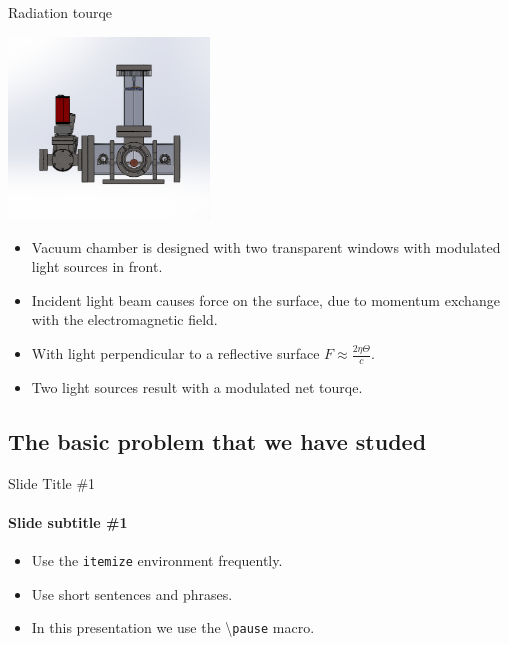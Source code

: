 \documentclass{beamer}
\begin{document}
\begin{frame}{\hypertarget{frame:Radiation tourqe}{Radiation tourqe}}
	\begin{center}		
		\includegraphics[width=0.4\textwidth,keepaspectratio]{total_chamber.png}
	\end{center}
	\begin{itemize}		
		\item Vacuum chamber is designed with two transparent windows with modulated light sources in front.
		\pause
		\item Incident light beam causes force on the surface, due to momentum exchange with the electromagnetic field.
		\pause
		\item With light perpendicular to a reflective surface $F  \approx\frac{2\eta\Theta}{{c}} $.
		\item Two light sources result with a modulated net tourqe.
		
	\end{itemize}
\end{frame}


\iffalse

\subsection[Basic Problem]{The basic problem that we have studed}

\begin{frame}{Slide Title \#1}
	\framesubtitle{Slide subtitle \#1}
	\begin{itemize}
		\item Use the \texttt{itemize} environment frequently.
		\pause
		\item Use short sentences and phrases.
		\pause
		\item In this presentation we use the \textbackslash{}\texttt{pause} macro.
	\end{itemize}
\end{frame}
\end{document}
